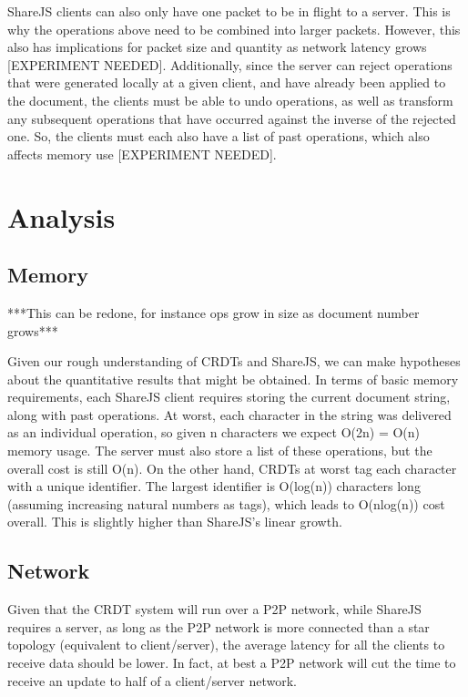 \documentclass[12pt,a4paper,twoside,openright]{report}
\begin{document}
	ShareJS clients can also only have one packet to be in flight to a server. This is why the operations above need to be combined into larger packets. However, this also has implications for packet size and quantity as network latency grows [EXPERIMENT NEEDED]. Additionally, since the server can reject operations that were generated locally at a given client, and have already been applied to the document, the clients must be able to undo operations, as well as transform any subsequent operations that have occurred against the inverse of the rejected one. So, the clients must each also have a list of past operations, which also affects memory use [EXPERIMENT NEEDED].

	
\section{Analysis}
	
	\subsection{Memory}
	
	***This can be redone, for instance ops grow in size as document number grows***
	
	Given our rough understanding of CRDTs and ShareJS, we can make hypotheses about the quantitative results that might be obtained. In terms of basic memory requirements, each ShareJS client requires storing the current document string, along with past operations. At worst, each character in the string was delivered as an individual operation, so given n characters we expect O(2n) = O(n) memory usage. The server must also store a list of these operations, but the overall cost is still O(n). On the other hand, CRDTs at worst tag each character with a unique identifier. The largest identifier is O(log(n)) characters long (assuming increasing natural numbers as tags), which leads to O(nlog(n)) cost overall. This is slightly higher than ShareJS's linear growth.
	
	\subsection{Network}
	
	Given that the CRDT system will run over a P2P network, while ShareJS requires a server, as long as the P2P network is more connected than a star topology (equivalent to client/server), the average latency for all the clients to receive data should be lower. In fact, at best a P2P network will cut the time to receive an update to half of a client/server network. 
	
\end{document}
